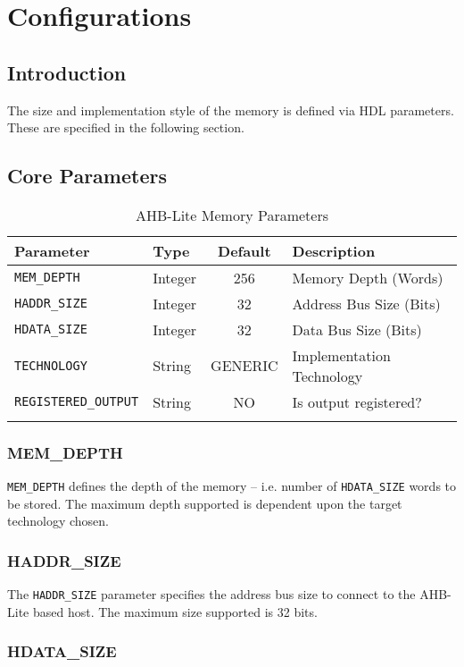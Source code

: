 \chapter{Configurations}\label{configurations}

\section{Introduction}\label{introduction-1}

The size and implementation style of the memory is defined via HDL parameters. These are specified in the following section.

\section{Core Parameters}\label{core-parameters}

\begin{longtable}[]{@{}llcl@{}}
	\toprule
	Parameter                   & Type    & Default & Description\tabularnewline
	\midrule
	\endhead
	\texttt{MEM\_DEPTH}         & Integer & 256     & Memory Depth (Words)\tabularnewline
	\texttt{HADDR\_SIZE}        & Integer & 32      & Address Bus Size (Bits)\tabularnewline
	\texttt{HDATA\_SIZE}        & Integer & 32      & Data Bus Size (Bits)\tabularnewline
	\texttt{TECHNOLOGY}         & String  & GENERIC & Implementation Technology\tabularnewline
	\texttt{REGISTERED\_OUTPUT} & String  & NO      & Is output registered?\tabularnewline
	\bottomrule
	\caption{AHB-Lite Memory Parameters}
\end{longtable}


 \subsection{MEM\_DEPTH}\label{mem_depth}

\texttt{MEM\_DEPTH} defines the depth of the memory -- i.e. number of \texttt{HDATA\_SIZE}
words to be stored. The maximum depth supported is dependent upon the
target technology chosen.

 \subsection{HADDR\_SIZE}\label{haddr_size}

The \texttt{HADDR\_SIZE} parameter specifies the address bus size to connect 
to the AHB-Lite based host. The maximum size supported is 32 bits.

 \subsection{HDATA\_SIZE}\label{hdata_size}

